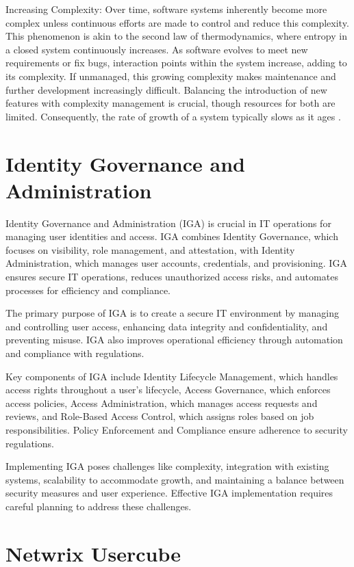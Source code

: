 Increasing Complexity: Over time, software systems inherently become more complex unless continuous efforts are made to control and reduce this complexity. This phenomenon is akin to the second law of thermodynamics, where entropy in a closed system continuously increases. As software evolves to meet new requirements or fix bugs, interaction points within the system increase, adding to its complexity. If unmanaged, this growing complexity makes maintenance and further development increasingly difficult. Balancing the introduction of new features with complexity management is crucial, though resources for both are limited. Consequently, the rate of growth of a system typically slows as it ages \cite{Lehman1978ProgramsCS}.

\section{Identity Governance and Administration}

Identity Governance and Administration (IGA) is crucial in IT operations for managing user identities and access. IGA combines Identity Governance, which focuses on visibility, role management, and attestation, with Identity Administration, which manages user accounts, credentials, and provisioning. IGA ensures secure IT operations, reduces unauthorized access risks, and automates processes for efficiency and compliance.

The primary purpose of IGA is to create a secure IT environment by managing and controlling user access, enhancing data integrity and confidentiality, and preventing misuse. IGA also improves operational efficiency through automation and compliance with regulations.

Key components of IGA include Identity Lifecycle Management, which handles access rights throughout a user's lifecycle, Access Governance, which enforces access policies, Access Administration, which manages access requests and reviews, and Role-Based Access Control, which assigns roles based on job responsibilities. Policy Enforcement and Compliance ensure adherence to security regulations.

Implementing IGA poses challenges like complexity, integration with existing systems, scalability to accommodate growth, and maintaining a balance between security measures and user experience. Effective IGA implementation requires careful planning to address these challenges.


\section{Netwrix Usercube}


